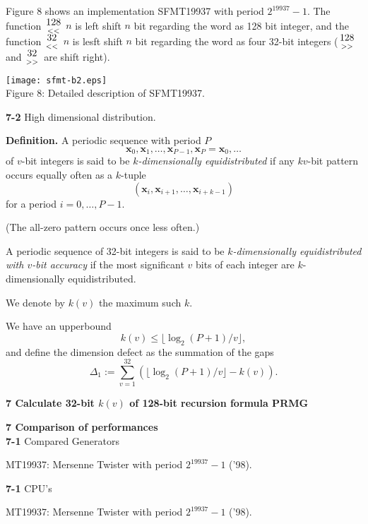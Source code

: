 \documentclass[a4j,12pt,landscape]{jarticle}
\def\bx{{{\mathbf x}}}
\newcommand{\lshift}[1]{{\large $\mbox{#1}\atop<<$}}
\newcommand{\rshift}[1]{{\large $\mbox{#1}\atop >>$}}
\begin{document}
\newpage
Figure 8 shows an implementation SFMT19937 with period
$2^{19937}-1$.  The function \lshift{128} $n$ is left shift $n$ bit
regarding the word as 128 bit integer, and the function \lshift{32} $n$ is
lesft shift $n$ bit regarding the word as four 32-bit integers
(\rshift{128} and \rshift{32} are shift right).

\begin{center}
\texttt{[image: sfmt-b2.eps]}
\\
Figure 8: Detailed description of SFMT19937.
\end{center}


\newpage
\noindent
{\bf 7-2} High dimensional distribution.

{\bf Definition.} 
A periodic sequence with period $P$
$$\bx_0, \bx_1, \ldots, \bx_{P-1}, \bx_P=\bx_0, \ldots$$
of $v$-bit integers is said to be {\em $k$-dimensionally equidistributed}
if any $kv$-bit pattern occurs equally often as a $k$-tuple
$$
(\bx_i, \bx_{i+1}, \ldots, \bx_{i+k-1})
$$
for a period $i=0,\ldots, P-1$. 

(The all-zero pattern occurs once less often.)

\newpage
A periodic sequence of 32-bit integers is said to be
{\em $k$-dimensionally equidistributed with $v$-bit accuracy}
if the most significant $v$ bits of each integer are
$k$-dimensionally equidistributed. 

We denote by $k(v)$ the maximum such $k$. 

\vskip 5mm
We have an upperbound 
$$
k(v) \leq \lfloor \log_2 (P+1) / v \rfloor, 
$$
and define the dimension defect as the summation of the gaps 
$$
\Delta_1 := \sum_{v=1}^{32}(\lfloor \log_2 (P+1) / v \rfloor -k(v)).
$$

\newpage
{\bf 7 Calculate 32-bit $k(v)$ of 128-bit recursion formula PRMG}

\newpage
\noindent
{\bf 7 Comparison of performances}
\\
{\bf 7-1} Compared Generators 
\begin{description}
\item MT19937: Mersenne Twister with period $2^{19937}-1$ ('98).
\end{description}
{\bf 7-1} CPU's
\begin{description}
\item MT19937: Mersenne Twister with period $2^{19937}-1$ ('98).
\end{description}
\newpage
\end{document}
